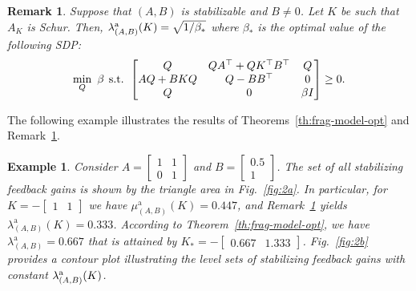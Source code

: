 \documentclass[9pt,shortpaper,twoside,web]{ieeecolor}
\DeclareMathOperator{\inter}{int}
\newtheorem{example}[theorem]{Example}
\newtheorem{remark}[theorem]{Remark}
\begin{document}
\begin{remark}
\label{th:frag_model}
Suppose that $(A,B)$ is stabilizable and $B\neq 0$. Let $K$ be such that $A_K$ is Schur. Then, $\lambda_{(A,B)}^\textup{a}(K)= \sqrt{1/\beta_*}$ where $\beta_*$ is the optimal value of the following SDP:
\begin{equation}
\label{eq:th:frag-model_s}
\min_{Q}\ \beta  \hspace{0.15 cm} \text{s.t.}\hspace{0.15 cm}
\begin{bmatrix}
Q & QA^\top+QK^\top B^\top  & Q \\
AQ+BKQ & Q-BB^\top  & 0 \\
Q & 0  & \beta I
\end{bmatrix}\geq 0.
\end{equation}

\end{remark}


The following example illustrates the results of Theorems~\ref{th:frag-model-opt} and Remark~\ref{th:frag_model}.


\begin{example}
\label{ex:2}
Consider $A=\begin{bmatrix}
        1 & 1 \\ 0 & 1
    \end{bmatrix}$ and $B=\begin{bmatrix}
        0.5 \\ 1
    \end{bmatrix}$.
The set of all stabilizing feedback gains is shown by the triangle area in Fig.~\ref{fig:2a}. In particular, for $K=-\begin{bmatrix}
1 & 1
\end{bmatrix}$ we have $\mu_{(A,B)}^{\text{a}}(K)=0.447$, and Remark~\ref{th:frag_model} yields $\lambda_{(A,B)}^{\text{a}}(K)=0.333$. According to Theorem~\ref{th:frag-model-opt}, we have $\lambda_{(A,B)}^{\text{a}}=0.667$ that is attained by $K_*=-\begin{bmatrix}
0.667 & 1.333
\end{bmatrix}$. Fig.~\ref{fig:2b} provides a contour plot illustrating the level sets of stabilizing feedback gains with constant $\lambda^\textup{a}_{(A,B)}(K)$.
\end{example}
\end{document}

